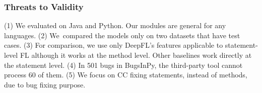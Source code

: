 \subsubsection{\bf Threats to Validity}
(1) We evaluated {\tool} on Java and Python. Our modules are
general for any languages. (2)
We~compared the models only on two datasets that have test cases.
(3) For comparison, we use only DeepFL's features applicable to
statement-level FL although it works at the method level. Other
baselines work directly at the statement level.
(4) In 501 bugs in BugsInPy, the third-party tool cannot process 60
of them. (5) We focus on CC fixing statements, instead of 
methods, due to bug fixing purpose.





